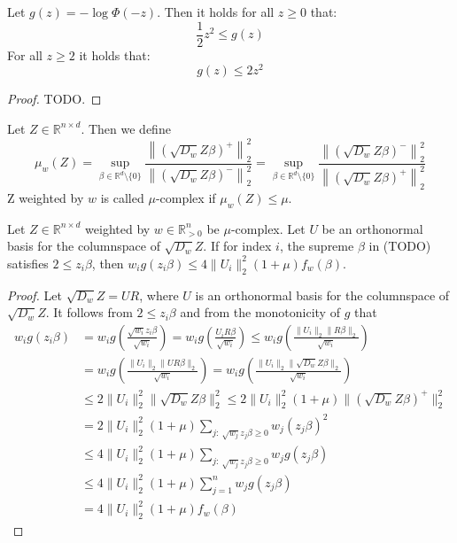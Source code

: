 \begin{lemma}
    Let $g(z) = -\log \Phi(-z)$. Then it holds for all $z \geq 0$ that:
    $$
        \frac{1}{2} z^2 \leq g(z)
    $$
    For all $z \geq 2$ it holds that:
    $$
        g(z) \leq 2z^2
    $$
\end{lemma}
\begin{proof}
    TODO.
\end{proof}

\begin{definition}
    Let $Z \in \mathbb{R}^{n \times d}$. Then we define
    $$
        \mu_w(Z) = \sup_{\beta \in \mathbb{R}^d \setminus \{0\}}
        \frac{\left \lVert (\sqrt{D_w} Z \beta)^+ \right \rVert_2^2}
        {\left \lVert (\sqrt{D_w} Z \beta)^- \right \rVert_2^2}
        =
        \sup_{\beta \in \mathbb{R}^d \setminus \{0\}}
        \frac{\left \lVert (\sqrt{D_w} Z \beta)^- \right \rVert_2^2}
        {\left \lVert (\sqrt{D_w} Z \beta)^+ \right \rVert_2^2}
    $$
    Z weighted by $w$ is called $\mu$-complex if $\mu_w(Z) \leq \mu$.
\end{definition}

\begin{lemma}
    Let $Z \in \mathbb{R}^{n \times d}$ weighted by $w \in \mathbb{R}^n_{>0}$
    be $\mu$-complex. Let $U$ be an orthonormal basis for the columnspace
    of $\sqrt{D_w} Z$. If for index $i$, the supreme $\beta$ in (TODO) satisfies
    $2 \leq z_i \beta$, then
    $w_i g(z_i \beta) \leq 4 \lVert U_i \rVert_2^2 (1 + \mu) f_w(\beta)$.
\end{lemma}
\begin{proof}
    Let $\sqrt{D_w} Z = UR$, where $U$ is an orthonormal basis for the columnspace
    of $\sqrt{D_w} Z$. It follows from $2 \leq z_i \beta$ and from the monotonicity
    of $g$ that
    \begin{align*}
        w_i g(z_i \beta)
         & = w_i g\left(\frac{\sqrt{w_i} z_i \beta}{\sqrt{w_i}}\right)
        = w_i g\left(\frac{U_i R \beta}{\sqrt{w_i}}\right)
        \leq w_i g\left(\frac{\lVert U_i \rVert_2 \lVert R \beta \rVert_2}{\sqrt{w_i}}\right)               \\
         & = w_i g\left(\frac{\lVert U_i \rVert_2 \lVert U R \beta \rVert_2}{\sqrt{w_i}}\right)
        = w_i g\left(\frac{\lVert U_i \rVert_2 \lVert \sqrt{D_w} Z \beta \rVert_2}{\sqrt{w_i}}\right)       \\
         & \leq 2 \lVert U_i \rVert_2^2 \lVert \sqrt{D_w} Z \beta \rVert_2^2
        \leq 2 \lVert U_i \rVert_2^2 (1 + \mu) \lVert (\sqrt{D_w} Z \beta)^+ \rVert_2^2                     \\
         & = 2 \lVert U_i \rVert_2^2 (1 + \mu) \sum_{j: \  \sqrt{w_j} z_j \beta \geq 0} w_j (z_j \beta)^2   \\
         & \leq 4 \lVert U_i \rVert_2^2 (1 + \mu) \sum_{j: \  \sqrt{w_j} z_j \beta \geq 0} w_j g(z_j \beta) \\
         & \leq 4 \lVert U_i \rVert_2^2 (1 + \mu) \sum_{j = 1}^n w_j g(z_j \beta)                           \\
         & = 4 \lVert U_i \rVert_2^2 (1 + \mu) f_w(\beta)
    \end{align*}
\end{proof}